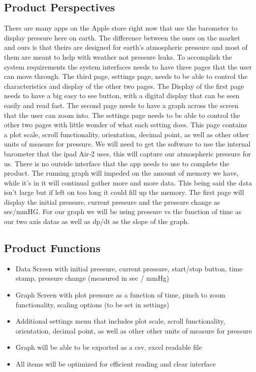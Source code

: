 \documentclass[onecolumn, draftclsnofoot,10pt, compsoc]{IEEEtran}
\begin{document}
\subsection{Product Perspectives}
There are many apps on the Apple store right now that use the barometer to display pressure here on earth.
The difference between the ones on the market and ours is that theirs are designed for earth's atmospheric pressure and most of them are meant to help with weather not pressure leaks.
To accomplish the system requirements the system interfaces needs to have three pages that the user can move through.
The third page, settings page, needs to be able to control the characteristics and display of the other two pages.
The Display of the first page needs to have a big easy to see button, with a digital display that can be seen easily and read fast.
The second page needs to have a graph across the screen that the user can zoom into.  The settings page needs to be able to control the other two pages with little wonder of what each setting does. This page contains a plot scale, scroll functionality, orientation, decimal point, as well as other other units of measure for pressure.
We will need to get the software to use the internal barometer that the ipad Air-2 uses, this will capture our atmospheric pressure for us.
There is no outside interface that the app needs to use to complete the product.
The running graph will impeded on the amount of memory we have, while it's in it will continual gather more and more data.
This being said the data isn't large but if left on too long it could fill up the memory.
The first page will display the initial pressure, current pressure and the pressure change as sec/mmHG.
For our graph we will be using pressure vs the function of time as our two axis datas as well as dp/dt as the slope of the graph.

\subsection{Product Functions}
\begin{itemize}
\item Data Screen with initial pressure, current pressure, start/stop button, time stamp, pressure change (measured in sec / mmHg)
\item Graph Screen with plot pressure as a function of time, pinch to zoom functionality, scaling options (to be set in settings)
\item Additional settings menu that includes plot scale, scroll functionality, orientation, decimal point, as well as other other units of measure for pressure
\item Graph will be able to be exported as a csv, excel readable file
\item All items will be optimized for efficient reading and clear interface
\end{itemize}
\end{document}
